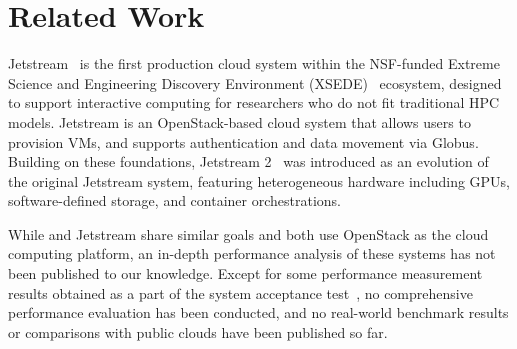 \section{Related Work}
Jetstream~\cite{Stewart2015} is the first production cloud system within the NSF-funded Extreme
Science and Engineering Discovery Environment (XSEDE)~\cite{Towns2014} ecosystem, designed to
support interactive computing for researchers who do not fit traditional HPC models. Jetstream is an
OpenStack-based cloud system that allows users to provision VMs, and supports authentication and
data movement via Globus. Building on these foundations, Jetstream 2~\cite{Hancock2021} was
introduced as an evolution of the original Jetstream system, featuring heterogeneous hardware
including GPUs, software-defined storage, and container orchestrations.

While \mdx{} and Jetstream share similar goals and both use OpenStack as the cloud computing
platform, an in-depth performance analysis of these systems has not been published to our knowledge.
Except for some performance measurement results obtained as a part of the system acceptance
test~\cite{Stewart2016}, no comprehensive performance evaluation has been conducted, and no
real-world benchmark results or comparisons with public clouds have been published so far.
